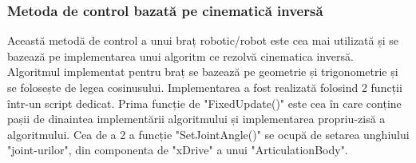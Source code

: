 \subsubsection{Metoda de control bazată pe cinematică inversă}
Această metodă de control a unui braț robotic/robot este cea mai utilizată și se bazează pe implementarea unui algoritm ce rezolvă cinematica inversă. Algoritmul implementat pentru braț se bazează pe geometrie și trigonometrie și se folosește de legea cosinusului. Implementarea a fost realizată folosind 2 funcții într-un script dedicat. Prima funcție de "FixedUpdate()" este cea în care conține pașii de dinaintea implementării algoritmului și implementarea propriu-zisă a algoritmului. Cea de a 2 a funcție "SetJointAngle()" se ocupă de setarea unghiului "joint-urilor", din componenta de "xDrive" a unui "ArticulationBody".

